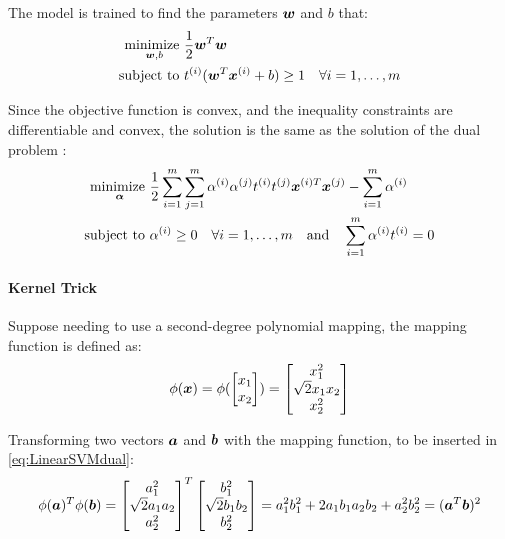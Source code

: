 The model is trained to find the parameters $\bm{w}$ and $b$ that:
\begin{align}
    \label{eq:LinearSVM}
    \underset{\bm{w},b}{\text{minimize }} & \frac{1}{2}\bm{w}^T\bm{w} \\
    \text{subject to } & t^{(i)}(\bm{w}^T\bm{x}^{(i)} + b) \geq 1 \quad \forall i = 1, \dots, m
\end{align}

Since the objective function is convex, and the inequality constraints are differentiable and convex, the solution is the same as the solution of the dual problem :
\begin{align}
    \label{eq:LinearSVMdual}
    \underset{\bm{\alpha}}{\text{minimize }} & \frac{1}{2}\sum_{i=1}^{m}\sum_{j=1}^{m}\alpha^{(i)}\alpha^{(j)}t^{(i)}t^{(j)}\bm{x}^{(i)T}\bm{x}^{(j)} -\sum_{i=1}^{m}\alpha^{(i)}\\
    \text{subject to } & \alpha^{(i)} \geq 0 \quad \forall i = 1, \dots, m \quad \text{and} \quad \sum_{i=1}^{m}\alpha^{(i)}t^{(i)}=0
\end{align}

\paragraph{Kernel Trick}
Suppose needing to use a second-degree polynomial mapping, the mapping function is defined as:
\begin{equation}
    \phi(\bm{x}) = \phi(\begin{bmatrix}
        x_1 \\
        x_2 \\
    \end{bmatrix}) = \begin{bmatrix}
        x_1^2 \\
        \sqrt{2}x_1x_2 \\
        x_2^2 \\
    \end{bmatrix}
\end{equation}

Transforming two vectors $\bm{a}$ and $\bm{b}$ with the mapping function, to be inserted in \autoref{eq:LinearSVMdual}:
\begin{equation}
    \phi(\bm{a})^T\phi(\bm{b}) = \begin{bmatrix}
        a_1^2 \\
        \sqrt{2}a_1a_2 \\
        a_2^2 \\
    \end{bmatrix}^T
    \begin{bmatrix}
        b_1^2 \\
        \sqrt{2}b_1b_2 \\
        b_2^2 \\
    \end{bmatrix} = a_1^2b_1^2 + 2a_1b_1a_2b_2 + a_2^2b_2^2 = (\bm{a}^T\bm{b})^2
\end{equation}

